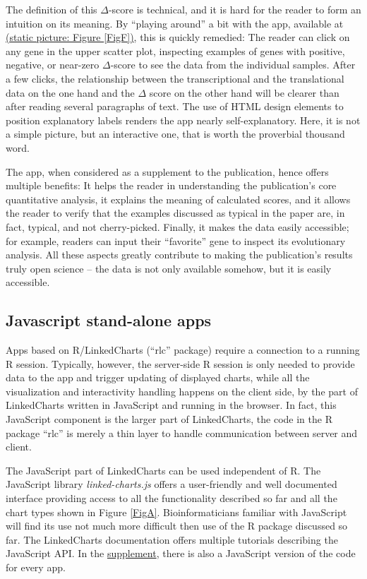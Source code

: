 \documentclass[twocolumn,10pt]{article}
\newcommand{\supplement}{\href{https://anders-biostat.github.io/lc-paper/}{supplement}}
\begin{document}
The definition of this $\Delta$-score is technical, and it is hard for the reader to form an intuition on its meaning. By ``playing around'' a bit with the app, available at \href{https://ex2plorer.kaessmannlab.org/}{(static picture: Figure \ref{FigF})}, this is quickly remedied:  The reader can click on any gene in the upper scatter plot, inspecting examples of genes with positive, negative, or near-zero $\Delta$-score to see the data from the individual samples. After a few clicks, the relationship between the transcriptional and the translational data on the one hand and the $\Delta$ score on the other hand will be clearer than after reading several paragraphs of text. The use of HTML design elements to position explanatory labels renders the app nearly self-explanatory. Here, it is not a simple picture, but an interactive one, that is worth the proverbial thousand word. 

The app, when considered as a supplement to the publication, hence offers multiple benefits: It helps the reader in understanding the publication's core quantitative analysis, it explains the meaning of calculated scores, and it allows the reader to verify that the examples discussed as typical in the paper are, in fact, typical, and not cherry-picked. Finally, it makes the data easily accessible; for example, readers can input their ``favorite'' gene to inspect its evolutionary analysis. All these aspects greatly contribute to making the publication's results truly open science -- the data is not only available somehow, but it is easily accessible.

\subsection{Javascript stand-alone apps}

Apps based on R/LinkedCharts (``rlc'' package) require a connection to a running R session. Typically, however, the server-side R session is only needed to provide data to the app and trigger updating of displayed charts, while all the visualization and interactivity handling happens on the client side, by the part of LinkedCharts written in JavaScript and running in the browser. In fact, this JavaScript component is the larger part of LinkedCharts, the code in the R package ``rlc'' is merely a thin layer to handle communication between server and client.

The JavaScript part of LinkedCharts can be used independent of R. The JavaScript library \emph{linked-charts.js} offers a user-friendly and well documented interface providing access to all the functionality described so far and all the chart types shown in Figure \ref{FigA}. Bioinformaticians familiar with JavaScript will find its use not much more difficult then use of the R package discussed so far. The LinkedCharts documentation offers multiple tutorials  describing the JavaScript API. In the \supplement, there is also a JavaScript version of the code for every app.
\end{document}
